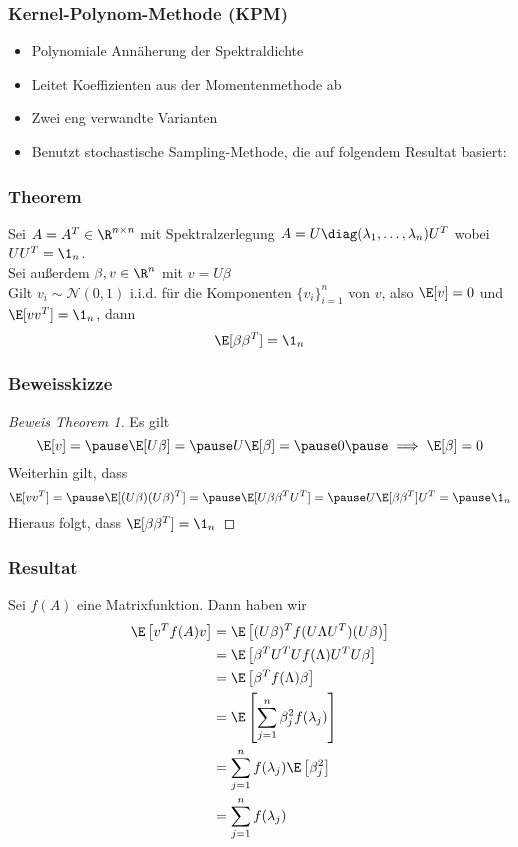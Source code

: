 \begin{frame}
    \frametitle{Kernel-Polynom-Methode (KPM)}
    \begin{itemize}
        \pause
        \item Polynomiale Annäherung der Spektraldichte
        \pause
        \item Leitet Koeffizienten aus der Momentenmethode ab
        \pause
        \item Zwei eng verwandte Varianten
        \pause
        \item Benutzt stochastische Sampling-Methode, die auf folgendem Resultat basiert:
    \end{itemize}
\end{frame}

\begin{frame}
    \frametitle{Theorem}
    \pause
    \begin{theorem}
        Sei $A = A^T \in \R^{n \times n}$ mit Spektralzerlegung $A = U \diag(\lambda_1, \dots, \lambda_n)U^T$ wobei $UU^T = \1_n$.\\
        Sei außerdem $\beta, v \in \R^n$ mit $v = U\beta$\\
        Gilt $v_i \sim \mathcal{N}(0, 1)$ i.i.d. für die Komponenten $\{v_i\}_{i = 1}^n$ von $v$, also $\E[v] = 0$ und $\E[vv^T] = \1_n$, dann
        $$\E[\beta \beta^T] = \1_n$$
    \end{theorem}
\end{frame}

\begin{frame}
    \frametitle{Beweisskizze}
    \pause
    \begin{proof}[Beweis Theorem 1]
        Es gilt
        $$\E[v] = \pause \E[U\beta] = \pause U\E[\beta] = \pause 0 \pause \implies \E[\beta] = 0$$
        \pause Weiterhin gilt, dass
        $$\E[vv^T] = \pause \E[(U\beta)(U\beta)^T] = \pause \E[U\beta \beta^TU^T] = \pause U \E[\beta \beta^T]U^T = \pause \1_n$$
        \pause Hieraus folgt, dass $\E[\beta \beta^T] = \1_n$
    \end{proof}
\end{frame}

\begin{frame}
    \frametitle{Resultat}
    \pause
    Sei $f(A)$ eine Matrixfunktion. Dann haben wir 
    \begin{align*}
        \E\left[v^Tf(A)v\right] & = \E\left[(U\beta)^Tf(U\Lambda U^T)(U\beta)\right]\\
         & = \E\left[\beta^TU^TUf(\Lambda)U^TU\beta\right]\\
         & = \E\left[\beta^Tf(\Lambda)\beta\right]\\
         & = \E\left[\sum_{j = 1}^n \beta_j^2 f(\lambda_j) \right]\\
         & = \sum_{j = 1}^n f(\lambda_j) \E\left[ \beta_j^2 \right]\\
         & = \sum_{j = 1}^n f(\lambda_j)
    \end{align*}
\end{frame}

